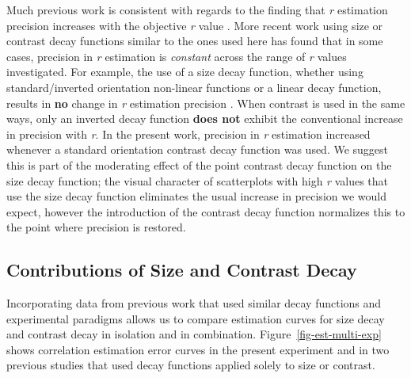 \documentclass[manuscript, review, anonymous, screen]{acmart}
\begin{document}
Much previous work is consistent with regards to the finding that
\emph{r} estimation precision increases with the objective \emph{r}
value
\citep{rensink_2010, rensink_2012, rensink_2014, rensink_2017, doherty_2007}.
More recent work using size or contrast decay functions similar to the
ones used here \citep{strain_2023, strain_2023b} has found that in some
cases, precision in \emph{r} estimation is \emph{constant} across the
range of \emph{r} values investigated. For example, the use of a size
decay function, whether using standard/inverted orientation non-linear
functions or a linear decay function, results in \textbf{no} change in
\emph{r} estimation precision \citep{strain_2023b}. When contrast is
used in the same ways, only an inverted decay function \textbf{does not}
exhibit the conventional increase in precision with \emph{r}. In the
present work, precision in \emph{r} estimation increased whenever a
standard orientation contrast decay function was used. We suggest this
is part of the moderating effect of the point contrast decay function on
the size decay function; the visual character of scatterplots with high
\emph{r} values that use the size decay function eliminates the usual
increase in precision we would expect, however the introduction of the
contrast decay function normalizes this to the point where precision is
restored.

\hypertarget{contributions-of-size-and-contrast-decay}{%
\subsection{Contributions of Size and Contrast
Decay}\label{contributions-of-size-and-contrast-decay}}

Incorporating data from previous work \citep{strain_2023, strain_2023b}
that used similar decay functions and experimental paradigms allows us
to compare estimation curves for size decay and contrast decay in
isolation and in combination. Figure~\ref{fig-est-multi-exp} shows
correlation estimation error curves in the present experiment and in two
previous studies that used decay functions applied solely to size or
contrast.
\end{document}
